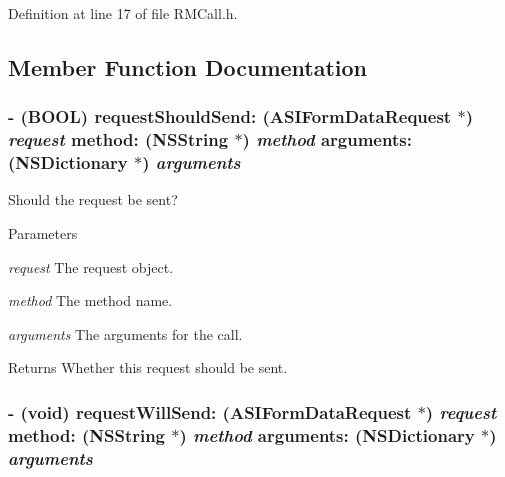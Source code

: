 Definition at line 17 of file RMCall.h.

\subsection{Member Function Documentation}
\hypertarget{protocol_r_m_call_protocol-p_a5656dcb18011d94f1d2de1e695741279}{
\subsubsection[{requestShouldSend:method:arguments:}]{\setlength{\rightskip}{0pt plus 5cm}-\/ (BOOL) requestShouldSend: ({\bf ASIFormDataRequest} $\ast$) {\em request}\/ method: ({\bf NSString} $\ast$) {\em method}\/ arguments: (NSDictionary $\ast$) {\em arguments}}}
\label{protocol_r_m_call_protocol-p_a5656dcb18011d94f1d2de1e695741279}


Should the request be sent? 
\begin{DoxyParams}{Parameters}
\item[{\em request}]The request object. \item[{\em method}]The method name. \item[{\em arguments}]The arguments for the call.\end{DoxyParams}
\begin{DoxyReturn}{Returns}
Whether this request should be sent. 
\end{DoxyReturn}
\hypertarget{protocol_r_m_call_protocol-p_a33f653fd32cbeae77545d77d7d80575c}{
\subsubsection[{requestWillSend:method:arguments:}]{\setlength{\rightskip}{0pt plus 5cm}-\/ (void) requestWillSend: ({\bf ASIFormDataRequest} $\ast$) {\em request}\/ method: ({\bf NSString} $\ast$) {\em method}\/ arguments: (NSDictionary $\ast$) {\em arguments}}}
\label{protocol_r_m_call_protocol-p_a33f653fd32cbeae77545d77d7d80575c}



